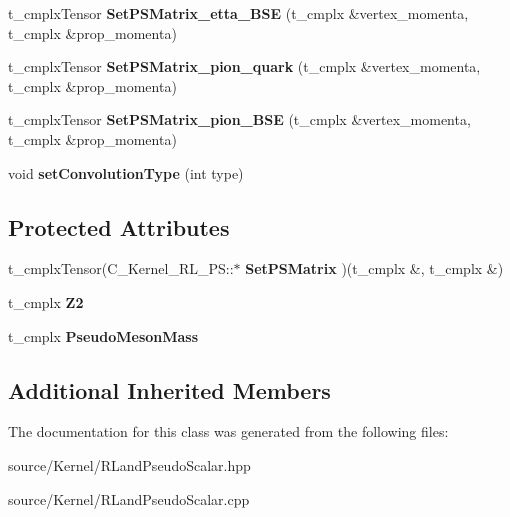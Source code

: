 \begin{DoxyCompactItemize}
\item 
\hypertarget{class_c___kernel___r_l___p_s_a727f610ca37be4a8c379f0a32ca43301}{t\-\_\-cmplx\-Tensor {\bfseries Set\-P\-S\-Matrix\-\_\-etta\-\_\-\-B\-S\-E} (t\-\_\-cmplx \&vertex\-\_\-momenta, t\-\_\-cmplx \&prop\-\_\-momenta)}\label{class_c___kernel___r_l___p_s_a727f610ca37be4a8c379f0a32ca43301}

\item 
\hypertarget{class_c___kernel___r_l___p_s_aa9e8de0d2615d212c08522fb004d9e9a}{t\-\_\-cmplx\-Tensor {\bfseries Set\-P\-S\-Matrix\-\_\-pion\-\_\-quark} (t\-\_\-cmplx \&vertex\-\_\-momenta, t\-\_\-cmplx \&prop\-\_\-momenta)}\label{class_c___kernel___r_l___p_s_aa9e8de0d2615d212c08522fb004d9e9a}

\item 
\hypertarget{class_c___kernel___r_l___p_s_afe3f06a61a5fa9cd043e4c4319fec8b0}{t\-\_\-cmplx\-Tensor {\bfseries Set\-P\-S\-Matrix\-\_\-pion\-\_\-\-B\-S\-E} (t\-\_\-cmplx \&vertex\-\_\-momenta, t\-\_\-cmplx \&prop\-\_\-momenta)}\label{class_c___kernel___r_l___p_s_afe3f06a61a5fa9cd043e4c4319fec8b0}

\item 
\hypertarget{class_c___kernel___r_l___p_s_a80a925fa85452e40566f03a9ba8e0e06}{void {\bfseries set\-Convolution\-Type} (int type)}\label{class_c___kernel___r_l___p_s_a80a925fa85452e40566f03a9ba8e0e06}

\end{DoxyCompactItemize}
\subsection*{Protected Attributes}
\begin{DoxyCompactItemize}
\item 
\hypertarget{class_c___kernel___r_l___p_s_adf4728ca0caa741eb5242e4c8b67ef44}{t\-\_\-cmplx\-Tensor(C\-\_\-\-Kernel\-\_\-\-R\-L\-\_\-\-P\-S\-::$\ast$ {\bfseries Set\-P\-S\-Matrix} )(t\-\_\-cmplx \&, t\-\_\-cmplx \&)}\label{class_c___kernel___r_l___p_s_adf4728ca0caa741eb5242e4c8b67ef44}

\item 
\hypertarget{class_c___kernel___r_l___p_s_a737ca2c158cc24d99d183314cd4ef248}{t\-\_\-cmplx {\bfseries Z2}}\label{class_c___kernel___r_l___p_s_a737ca2c158cc24d99d183314cd4ef248}

\item 
\hypertarget{class_c___kernel___r_l___p_s_afa5aab2c72c55dd84fd3dd0f4a6e374b}{t\-\_\-cmplx {\bfseries Pseudo\-Meson\-Mass}}\label{class_c___kernel___r_l___p_s_afa5aab2c72c55dd84fd3dd0f4a6e374b}

\end{DoxyCompactItemize}
\subsection*{Additional Inherited Members}


The documentation for this class was generated from the following files\-:\begin{DoxyCompactItemize}
\item 
source/\-Kernel/R\-Land\-Pseudo\-Scalar.\-hpp\item 
source/\-Kernel/R\-Land\-Pseudo\-Scalar.\-cpp\end{DoxyCompactItemize}
